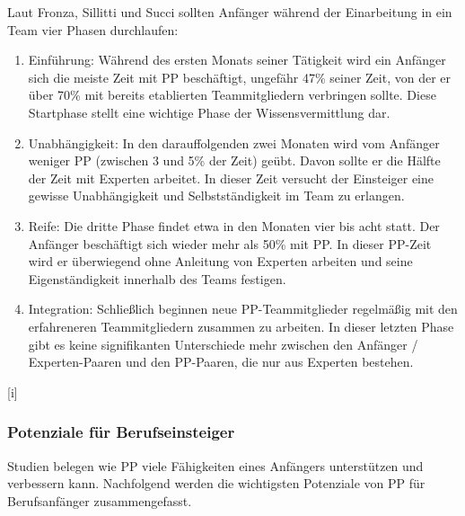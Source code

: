Laut Fronza, Sillitti und Succi\cite{Fronza2009AnTeam} sollten Anfänger während der Einarbeitung in ein Team vier Phasen durchlaufen:

\begin{enumerate}[i]
\item Einführung: Während des ersten Monats seiner Tätigkeit wird ein Anfänger sich die meiste Zeit mit PP beschäftigt, ungefähr 47\% seiner Zeit, von der er über 70\% mit bereits etablierten Teammitgliedern verbringen sollte. Diese Startphase stellt eine wichtige Phase der Wissensvermittlung dar.

\item Unabhängigkeit: In den darauffolgenden zwei Monaten wird vom Anfänger weniger PP (zwischen 3 und 5\% der Zeit) geübt. Davon sollte er die Hälfte der Zeit mit Experten arbeitet. In dieser Zeit versucht der Einsteiger eine gewisse Unabhängigkeit und Selbstständigkeit im Team zu erlangen.

\item Reife: Die dritte Phase findet etwa in den Monaten vier bis acht statt. Der Anfänger beschäftigt sich wieder mehr als 50\% mit PP. In dieser PP-Zeit wird er überwiegend ohne Anleitung von Experten arbeiten und seine Eigenständigkeit innerhalb des Teams festigen.

\item Integration: Schließlich beginnen neue PP-Teammitglieder regelmäßig mit den erfahreneren Teammitgliedern zusammen zu arbeiten. In dieser letzten Phase gibt es keine signifikanten Unterschiede mehr zwischen den Anfänger / Experten-Paaren und den PP-Paaren, die nur aus Experten bestehen.
\end{enumerate}[i]

\subsubsection{Potenziale für Berufseinsteiger}
Studien belegen wie PP viele Fähigkeiten eines Anfängers unterstützen und verbessern kann. Nachfolgend werden die wichtigsten Potenziale von PP für Berufsanfänger zusammengefasst.

